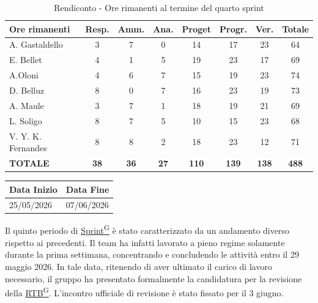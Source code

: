 \documentclass[a4paper,12pt]{article}
\newcounter{subsubsubsection}[subsubsection]
\providecommand{\glslink}[2]{\href{https://alittlebyte-19.github.io/Documentazione/glossario.html\#gls-#1}{\underline{#2}\textsuperscript{\scriptsize G}}}
\begin{document}
\begin{table}[htbp]
\centering
\renewcommand{\arraystretch}{1.5} 
\begin{tabularx}{\textwidth}{|X|c|c|c|c|c|c|c|}
\hline
\textbf{Ore rimanenti} & \textbf{Resp.} & \textbf{Amm.} & \textbf{Ana.} & \textbf{Proget} & \textbf{Progr.} & \textbf{Ver.} & \textbf{Totale} \\
\hline
A. Gastaldello & 3 & 7 & 0 & 14 & 17 & 23 & 64 \\
\hline
E. Bellet & 4 & 1 & 5 & 19 & 23 & 17 & 69 \\
\hline
A.Oloni & 4 & 6 & 7 & 15 & 19 & 23 & 74 \\
\hline
D. Belluz & 8 & 0 & 7 & 16 & 23 & 19 & 73 \\
\hline
A. Maule & 3 & 7 & 1 & 18 & 19 & 21 & 69 \\
\hline
L. Soligo & 8 & 7 & 5 & 10 & 15 & 23 & 68 \\
\hline
V. Y. K. Fernandes & 8 & 8 & 2 & 18 & 23 & 12 & 71 \\
\hline
\rowcolor{gray!20}
\textbf{TOTALE} & \textbf{38} & \textbf{36} & \textbf{27} & \textbf{110} & \textbf{139} & \textbf{138} & \textbf{488} \\
\hline
\end{tabularx}
\caption{Rendiconto - Ore rimanenti al termine del quarto sprint}
\end{table}


\newpage


\label{sec:rtb_quintoperiodo}
\begin{table}[H]
    \centering
    \renewcommand{\arraystretch}{1.5} 
    \begin{tabularx}{\textwidth}{|X|X|}
    \hline \rowcolor{Dandelion!50}
    \textbf{Data Inizio} & \textbf{Data Fine}\\
    \hline
    25/05/2026 & 07/06/2026\\
    \hline

    \end{tabularx}
\end{table}

Il quinto periodo di \glslink{sprint}{Sprint} è stato caratterizzato da un andamento diverso rispetto ai precedenti. Il team ha infatti lavorato a pieno regime solamente durante la prima settimana, concentrando e concludendo le attività entro il 29 maggio 2026. In tale data, ritenendo di aver ultimato il carico di lavoro necessario, il gruppo ha presentato formalmente la candidatura per la revisione della \glslink{rtb-requirements-and-technology-baseline}{RTB}. L'incontro ufficiale di revisione è stato fissato per il 3 giugno. 
\end{document}
